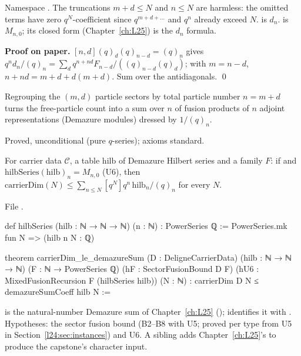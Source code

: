 \begin{dictionary}
Namespace . The truncations $m+d\le N$ and $n\le N$ are harmless: the omitted
terms have zero $q^N$-coefficient since $q^{m+d+\dots}$ and $q^n$ already exceed $N$.  is
$d_n$.  is $M_{n,0}$; its closed form  (Chapter~\ref{ch:L25}) is
the $d_n$ formula.
\end{dictionary}

\textbf{Proof on paper.} $[n,d](q)_d(q)_{n-d}=(q)_n$ gives
$q^nd_n/(q)_n=\sum_dq^{n+nd}F_{n-d}/((q)_{n-d}(q)_d)$; with $m=n-d$, $n+nd=m+d+d(m+d)$. Sum over the
antidiagonals. \qed

\begin{physics}
Regrouping the $(m,d)$ particle sectors by total particle number $n=m+d$ turns the free-particle count into a
sum over $n$ of fusion products of $n$ adjoint representations (Demazure modules) dressed by $1/(q)_n$.
\end{physics}

\begin{status}
Proved, unconditional (pure $q$-series); axioms standard.
\end{status}

\begin{theorem}\label{l24:thm:carrierside}
For carrier data $\mathscr C$, a table $\mathrm{hilb}$ of Demazure Hilbert series and a family $F$: if
 and $\mathrm{hilbSeries}(\mathrm{hilb})_n=M_{n,0}$ (U6), then
$\mathrm{carrierDim}(N)\le\sum_{n\le N}[q^N]q^n\,\mathrm{hilb}_n/(q)_n$ for every $N$.
\end{theorem}
\noindent File .
\begin{leancode}
def hilbSeries (hilb : ℕ → ℕ → ℕ) (n : ℕ) : PowerSeries ℚ :=
  PowerSeries.mk fun N => (hilb n N : ℚ)

theorem carrierDim_le_demazureSum (D : DeligneCarrierData) (hilb : ℕ → ℕ → ℕ)
    (F : ℕ → PowerSeries ℚ) (hF : SectorFusionBound D F)
    (hU6 : MixedFusionRecursion F (hilbSeries hilb)) (N : ℕ) :
    carrierDim D N ≤ demazureSumCoeff hilb N :=
\end{leancode}

\begin{dictionary}
 is the natural-number Demazure sum of Chapter~\ref{ch:L25}
();  identifies it with .
Hypotheses: the sector fusion bound (B2--B8 with U5; proved per type from U5 in Section~\ref{l24:sec:instances})
and U6. A sibling  adds Chapter~\ref{ch:L25}'s
 to produce the capstone's character input.
\end{dictionary}

